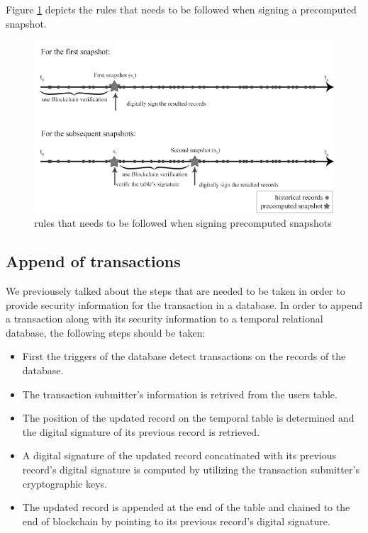 			Figure \ref{fig:signing_snapshots} depicts the rules that needs to be followed when signing a precomputed snapshot.

			\begin{figure}
				\centering
				\includegraphics[width=\textwidth]{figs/signing_snapshots.pdf}
				\caption{rules that needs to be followed when signing precomputed snapshots}
				\label{fig:signing_snapshots}
			\end{figure}

		\subsection{Append of transactions}
		We previousely talked about the steps that are needed to be taken in order to provide security information for the transaction in a database. In order to append a transaction along with its security information to a temporal relational database, the following steps should be taken:
		\begin {itemize}
			\item First the triggers of the database detect transactions on the records of the database.
			\item The transaction submitter's information is retrived from the users table.
			\item The position of the updated record on the temporal table is determined and the digital signature of its previous record is retrieved.
			\item A digital signature of the updated record concatinated with its previous record's digital signature is computed by utilizing the transaction submitter's cryptographic keys.
			\item The updated record is appended at the end of the table and chained to the end of blockchain by pointing to its previous record's digital signature.
		\end{itemize}

